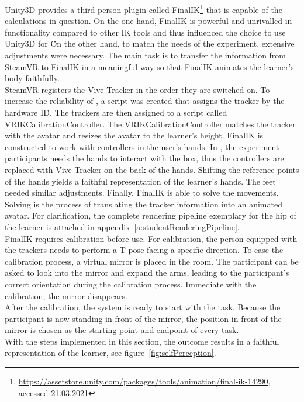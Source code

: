 Unity3D provides a third-person plugin called FinalIK\footnote{\href{https://assetstore.unity.com/packages/tools/animation/final-ik-14290}{https://assetstore.unity.com/packages/tools/animation/final-ik-14290}, accessed 21.03.2021} that is capable of the calculations in question. On the one hand, FinalIK is powerful and unrivalled in functionality compared to other IK tools and thus influenced the choice to use Unity3D for \exgo\. On the other hand, to match the needs of the experiment, extensive adjustments were necessary. The main task is to transfer the information from SteamVR to FinalIK in a meaningful way so that FinalIK animates the learner's body faithfully.\\
SteamVR registers the Vive Tracker in the order they are switched on. To increase the reliability of \exgo, a script was created that assigns the tracker by the hardware ID. The trackers are then assigned to a script called VRIKCalibrationController. The VRIKCalibrationController matches the tracker with the avatar and resizes the avatar to the learner's height. FinalIK is constructed to work with controllers in the user's hands. In \exgo, the experiment participants needs the hands to interact with the box, thus the controllers are replaced with Vive Tracker on the back of the hands. Shifting the reference points of the hands yields a faithful representation of the learner's hands. The feet needed similar adjustments. Finally, FinalIK is able to solve the movements. Solving is the process of translating the tracker information into an animated avatar. For clarification, the complete rendering pipeline exemplary for the hip of the learner is attached in appendix~\ref{a:studentRenderingPipeline}.\\
FinalIK requires calibration before use. For calibration, the person equipped with the trackers needs to perform a T-pose facing a specific direction. To ease the calibration process, a virtual mirror is placed in the room. The participant can be asked to look into the mirror and expand the arms, leading to the participant's correct orientation during the calibration process. Immediate with the calibration, the mirror disappears.\\
After the calibration, the system is ready to start with the task. Because the participant is now standing in front of the mirror, the position in front of the mirror is chosen as the starting point and endpoint of every task.\\
With the steps implemented in this section, the outcome results in a faithful representation of the learner, see figure~\ref{fig:selfPerception}.\\

